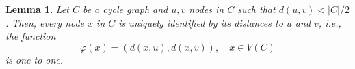 \documentclass[fleqn,11pt]{article}
\newtheorem{lemma}[theorem]{Lemma}
\begin{document}
%		

\begin{lemma}
	Let $C$ be a cycle graph and $u,v$ nodes in $C$ such that $d(u,v)<|C|/2$. Then, every node $x$ in $C$ is uniquely identified by its distances to $u$ and $v$, i.e., the function
	\begin{equation}
		\varphi(x) = (d(x,u),d(x,v)),\quad x\in V(C)\label{eq:phi_def}
	\end{equation}
	is one-to-one.
	\label{Lem:cyc_embed}
\end{lemma}
\end{document}
